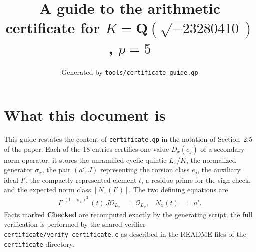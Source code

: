 \documentclass[11pt]{article}
\title{A guide to the arithmetic certificate for $K=\mathbf Q(\sqrt{-23280410})$, $p=5$}
\author{}
\date{Generated by \texttt{tools/certificate\_guide.gp}}
\begin{document}
\maketitle
\section*{What this document is}
This guide restates the content of \texttt{certificate.gp} in the
notation of Section~2.5 of the paper.  Each of the 18 entries
certifies one value $D_x(e_j)$ of a secondary norm operator: it
stores the unramified cyclic quintic $L_x/K$, the normalized
generator $\sigma_x$, the pair $(a',J)$ representing the torsion
class $e_j$, the auxiliary ideal $I'$, the compactly represented
element $t$, a residue prime for the sign check, and the expected
norm class $[N_x(I')]$.  The two defining equations are
\begin{align*}
I'^{\,(1-\sigma_x)^2}\,(t)\,J\mathcal O_{L_x}&=\mathcal O_{L_x},&
N_x(t)&=a'.
\end{align*}
Facts marked \textbf{Checked} are recomputed exactly by the
generating script; the full verification is performed by the
shared verifier \texttt{certificate/verify\_certificate.c} as
described in the README files of the \texttt{certificate}
directory.
\end{document}
